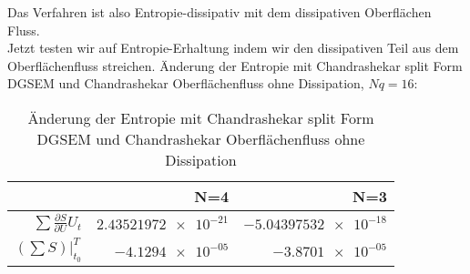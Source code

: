 \documentclass[11pt]{scrartcl}
\begin{document}
Das Verfahren ist also Entropie-dissipativ mit dem dissipativen Oberflächen Fluss. \\ 
Jetzt testen wir auf Entropie-Erhaltung indem wir den dissipativen Teil aus dem Oberflächenfluss streichen.
Änderung der Entropie mit Chandrashekar split Form DGSEM und Chandrashekar Oberflächenfluss ohne Dissipation, $Nq = 16$: 
\begin{table}[H]
\centering
\begin{tabular}{|r|r|r|}
    \hline\hline
     & \textbf{N=4} & \textbf{N=3} \\\hline
    $\sum \frac{\partial S}{\partial U} U_t$ & $\num{2.43521972e-21}$ & $\num{-5.04397532e-18}$ \\
    $\left( \sum S \right) |_{t_0}^{T}$ & $\num{-4.1294e-05}$ & $\num{-3.8701e-05}$ \\\hline\hline
\end{tabular}
\caption{Änderung der Entropie mit Chandrashekar split Form DGSEM und Chandrashekar Oberflächenfluss ohne Dissipation}
\end{table}
\end{document}
